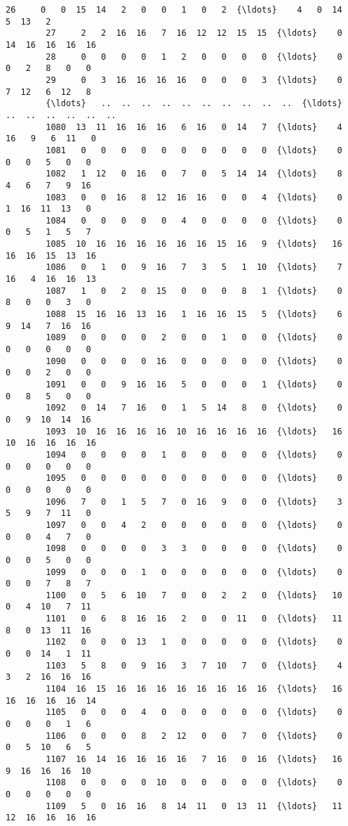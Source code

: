 \documentclass[11pt]{article}
\begin{document}
\begin{Verbatim}[commandchars=\\\{\}]
        26     0   0  15  14   2   0   0   1   0   2  {\ldots}    4   0  14   5  13   2   
        27     2   2  16  16   7  16  12  12  15  15  {\ldots}    0  14  16  16  16  16   
        28     0   0   0   0   1   2   0   0   0   0  {\ldots}    0   0   2   8   0   0   
        29     0   3  16  16  16  16   0   0   0   3  {\ldots}    0   7  12   6  12   8   
        {\ldots}   ..  ..  ..  ..  ..  ..  ..  ..  ..  ..  {\ldots}   ..  ..  ..  ..  ..  ..   
        1080  13  11  16  16  16   6  16   0  14   7  {\ldots}    4  16   9   6  11   0   
        1081   0   0   0   0   0   0   0   0   0   0  {\ldots}    0   0   0   5   0   0   
        1082   1  12   0  16   0   7   0   5  14  14  {\ldots}    8   4   6   7   9  16   
        1083   0   0  16   8  12  16  16   0   0   4  {\ldots}    0   1  16  11  13   0   
        1084   0   0   0   0   0   4   0   0   0   0  {\ldots}    0   0   5   1   5   7   
        1085  10  16  16  16  16  16  16  15  16   9  {\ldots}   16  16  16  15  13  16   
        1086   0   1   0   9  16   7   3   5   1  10  {\ldots}    7  16   4  16  16  13   
        1087   1   0   2   0  15   0   0   0   8   1  {\ldots}    0   8   0   0   3   0   
        1088  15  16  16  13  16   1  16  16  15   5  {\ldots}    6   9  14   7  16  16   
        1089   0   0   0   0   2   0   0   1   0   0  {\ldots}    0   0   0   0   0   0   
        1090   0   0   0   0  16   0   0   0   0   0  {\ldots}    0   0   0   2   0   0   
        1091   0   0   9  16  16   5   0   0   0   1  {\ldots}    0   0   8   5   0   0   
        1092   0  14   7  16   0   1   5  14   8   0  {\ldots}    0   0   9  10  14  16   
        1093  10  16  16  16  16  10  16  16  16  16  {\ldots}   16  10  16  16  16  16   
        1094   0   0   0   0   1   0   0   0   0   0  {\ldots}    0   0   0   0   0   0   
        1095   0   0   0   0   0   0   0   0   0   0  {\ldots}    0   0   0   0   0   0   
        1096   7   0   1   5   7   0  16   9   0   0  {\ldots}    3   5   9   7  11   0   
        1097   0   0   4   2   0   0   0   0   0   0  {\ldots}    0   0   0   4   7   0   
        1098   0   0   0   0   3   3   0   0   0   0  {\ldots}    0   0   0   5   0   0   
        1099   0   0   0   1   0   0   0   0   0   0  {\ldots}    0   0   0   7   8   7   
        1100   0   5   6  10   7   0   0   2   2   0  {\ldots}   10   0   4  10   7  11   
        1101   0   6   8  16  16   2   0   0  11   0  {\ldots}   11   8   0  13  11  16   
        1102   0   0   0  13   1   0   0   0   0   0  {\ldots}    0   0   0  14   1  11   
        1103   5   8   0   9  16   3   7  10   7   0  {\ldots}    4   3   2  16  16  16   
        1104  16  15  16  16  16  16  16  16  16  16  {\ldots}   16  16  16  16  16  14   
        1105   0   0   0   4   0   0   0   0   0   0  {\ldots}    0   0   0   0   1   6   
        1106   0   0   0   8   2  12   0   0   7   0  {\ldots}    0   0   5  10   6   5   
        1107  16  14  16  16  16  16   7  16   0  16  {\ldots}   16   9  16  16  16  10   
        1108   0   0   0   0  10   0   0   0   0   0  {\ldots}    0   0   0   0   0   0   
        1109   5   0  16  16   8  14  11   0  13  11  {\ldots}   11  12  16  16  16  16   
        

\end{Verbatim}
\end{document}
